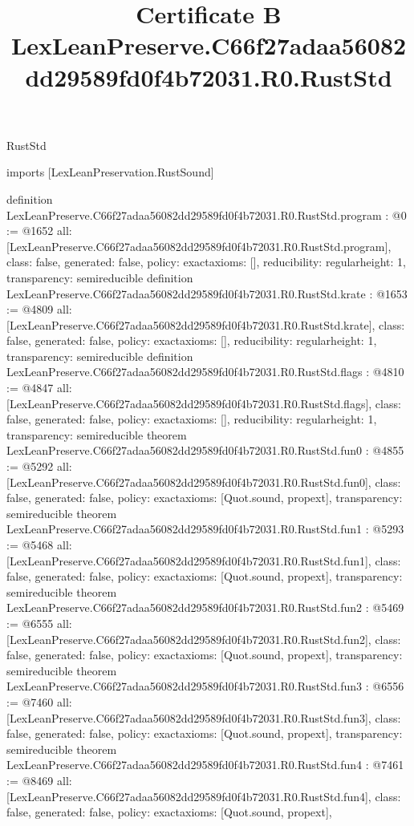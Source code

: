 \begin{lexlean}{RustStd}
\title{Certificate B LexLeanPreserve.C66f27adaa56082dd29589fd0f4b72031.R0.RustStd}
\begin{coremodule}
imports [LexLeanPreservation.RustSound]

definition LexLeanPreserve.C66f27adaa56082dd29589fd0f4b72031.R0.RustStd.program : @0 := @1652 {
  all: [LexLeanPreserve.C66f27adaa56082dd29589fd0f4b72031.R0.RustStd.program],
  class: false,
  generated: false,
  policy: exact{axioms: []},
  reducibility: regular{height: 1},
  transparency: semireducible
}
definition LexLeanPreserve.C66f27adaa56082dd29589fd0f4b72031.R0.RustStd.krate : @1653 := @4809 {
  all: [LexLeanPreserve.C66f27adaa56082dd29589fd0f4b72031.R0.RustStd.krate],
  class: false,
  generated: false,
  policy: exact{axioms: []},
  reducibility: regular{height: 1},
  transparency: semireducible
}
definition LexLeanPreserve.C66f27adaa56082dd29589fd0f4b72031.R0.RustStd.flags : @4810 := @4847 {
  all: [LexLeanPreserve.C66f27adaa56082dd29589fd0f4b72031.R0.RustStd.flags],
  class: false,
  generated: false,
  policy: exact{axioms: []},
  reducibility: regular{height: 1},
  transparency: semireducible
}
theorem LexLeanPreserve.C66f27adaa56082dd29589fd0f4b72031.R0.RustStd.fun0 : @4855 := @5292 {
  all: [LexLeanPreserve.C66f27adaa56082dd29589fd0f4b72031.R0.RustStd.fun0],
  class: false,
  generated: false,
  policy: exact{axioms: [Quot.sound, propext]},
  transparency: semireducible
}
theorem LexLeanPreserve.C66f27adaa56082dd29589fd0f4b72031.R0.RustStd.fun1 : @5293 := @5468 {
  all: [LexLeanPreserve.C66f27adaa56082dd29589fd0f4b72031.R0.RustStd.fun1],
  class: false,
  generated: false,
  policy: exact{axioms: [Quot.sound, propext]},
  transparency: semireducible
}
theorem LexLeanPreserve.C66f27adaa56082dd29589fd0f4b72031.R0.RustStd.fun2 : @5469 := @6555 {
  all: [LexLeanPreserve.C66f27adaa56082dd29589fd0f4b72031.R0.RustStd.fun2],
  class: false,
  generated: false,
  policy: exact{axioms: [Quot.sound, propext]},
  transparency: semireducible
}
theorem LexLeanPreserve.C66f27adaa56082dd29589fd0f4b72031.R0.RustStd.fun3 : @6556 := @7460 {
  all: [LexLeanPreserve.C66f27adaa56082dd29589fd0f4b72031.R0.RustStd.fun3],
  class: false,
  generated: false,
  policy: exact{axioms: [Quot.sound, propext]},
  transparency: semireducible
}
theorem LexLeanPreserve.C66f27adaa56082dd29589fd0f4b72031.R0.RustStd.fun4 : @7461 := @8469 {
  all: [LexLeanPreserve.C66f27adaa56082dd29589fd0f4b72031.R0.RustStd.fun4],
  class: false,
  generated: false,
  policy: exact{axioms: [Quot.sound, propext]},
}
\end{coremodule}
\end{lexlean}
